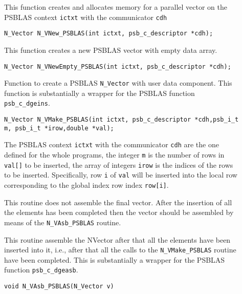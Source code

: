 \documentclass[twoside,a4paper]{refart}
\begin{document}
\begin{description}
	\item[] This function creates and allocates memory for a parallel vector
	on the PSBLAS context \lstinline[style=CStyle]|ictxt| with the communicator \lstinline[style=CStyle]|cdh|
	
	 \lstinline[style=CStyle]|N_Vector N_VNew_PSBLAS(int ictxt, psb_c_descriptor *cdh);|
	
	\item[] This function creates a new PSBLAS vector with empty data array.
	
	 \lstinline[style=CStyle]|N_Vector N_VNewEmpty_PSBLAS(int ictxt, psb_c_descriptor *cdh);|
	
	\item[] Function to create a PSBLAS \texttt{N\_Vector} with user data component. This function is substantially a wrapper for the PSBLAS function \lstinline[style=CStyle]|psb_c_dgeins|.
	
	 \lstinline[style=CStyle]|N_Vector N_VMake_PSBLAS(int ictxt, psb_c_descriptor *cdh,psb_i_t m, psb_i_t *irow,double *val);|
	
	The PSBLAS context \lstinline[style=CStyle]|ictxt| with the communicator \lstinline[style=CStyle]|cdh| are the one defined for the whole programs, the integer \lstinline[style=CStyle]{m} is the number of rows in \lstinline[style=CStyle]{val[]} to be inserted, the array of integers \lstinline[style=CStyle]{irow} is the indices of the rows to be inserted. Specifically, row \lstinline[style=CStyle]|i| of \lstinline[style=CStyle]|val| will be inserted into the local row corresponding to the global index row index \lstinline[style=CStyle]|row[i]|.
	
	\attention This routine does not assemble the final vector. After the insertion of all the elements has been completed then the vector should be assembled by means of the \texttt{N\_VAsb\_PSBLAS} routine.
	
	\item[] This routine assemble the NVector after that all the elements have been inserted into it, i.e., after that all the calls to the \texttt{N\_VMake\_PSBLAS} routine have been completed. This is substantially a wrapper for the PSBLAS function \lstinline[style=CStyle]|psb_c_dgeasb|.
	
	 \lstinline[style=CStyle]|void N_VAsb_PSBLAS(N_Vector v)|
	

\end{description}
\end{document}
